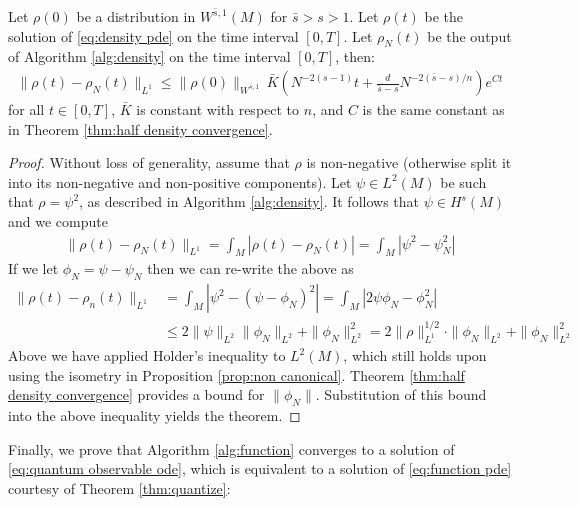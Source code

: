 \documentclass[final,leqno]{siamltex1213}
\begin{document}
\begin{theorem} \label{thm:density convergence}
	Let $\rho(0)$ be a distribution in $W^{\bar{s},1}(M)$ for $\bar{s} > s >1$.
	Let $\rho(t)$ be the solution of \eqref{eq:density pde} on the time interval $[0,T]$.
	Let $\rho_{N}(t)$ be the output of Algorithm \ref{alg:density} on the time interval $[0,T]$, then:
	\begin{align}
		\| \rho(t) - \rho_{N}(t) \|_{L^{1}} \leq \| \rho(0) \|_{W^{\bar{s},1}} \, \bar{K} \left( N^{-2(s-1)} t+  \frac{d}{\bar{s}-s} N^{-2(\bar{s}-s)/n} \right) e^{C t}
	\end{align}
	for all $t \in [0,T]$, $\bar{K}$ is constant with respect to $n$, and $C$ is the same constant as in Theorem \ref{thm:half density convergence}.
\end{theorem}

\begin{proof}
	Without loss of generality, assume that $\rho$ is non-negative (otherwise split it into its non-negative and non-positive components).
	Let $\psi \in L^{2}(M)$ be such that $\rho =  \psi ^{2}$, as described in Algorithm \ref{alg:density}.
	It follows that $\psi \in H^{s}(M)$ and we compute
	\begin{align}
		\| \rho(t) - \rho_{N}(t) \|_{L^{1}} = \int_{M} | \rho(t) - \rho_{N}(t)| = \int_{M} | \psi^{2} - \psi_{N}^{2} |
	\end{align}
	If we let $\phi_{N} = \psi - \psi_{N}$ then we can re-write the above as
	\begin{align}
		\| \rho(t) - \rho_{n}(t) \|_{L^{1}}  &= \int_{M} | \psi^{2} - (\psi - \phi_{N})^{2} | = \int_{M} | 2 \psi \phi_{N} - \phi_{N}^{2} | \\
			&\leq 2 \| \psi \|_{L^{2}} \| \phi_{N}\|_{L^{2}} + \| \phi_{N} \|_{L^{2}}^{2} = 2 \| \rho \|_{L^{1}}^{1/2} \cdot \| \phi_{N} \|_{L^{2}} + \| \phi_{N} \|_{L^{2}}^{2}
	\end{align}
	Above we have applied Holder's inequality to $L^{2}(M)$, which still holds upon using the isometry in Proposition \ref{prop:non canonical}.
	Theorem \ref{thm:half density convergence} provides a bound for $\| \phi_{N} \|$.
	Substitution of this bound into the above inequality yields the theorem.
\end{proof}

Finally, we prove that Algorithm \ref{alg:function} converges to a solution of \eqref{eq:quantum observable ode}, which is equivalent to a solution of \eqref{eq:function pde} courtesy of Theorem \ref{thm:quantize}:
\end{document}
